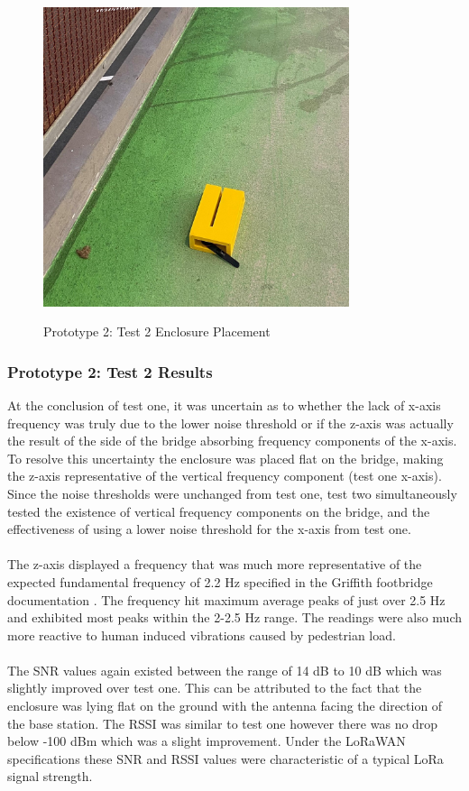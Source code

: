 \begin{figure}[H]
	\centering
	\caption{Prototype 2: Test 2 Enclosure Placement}
	\includegraphics[width=0.8\textwidth]{Sections/Prototype-Testing/bridge-ground.png}
	\label{bridge-ground}
\end{figure}

\subsubsection{Prototype 2: Test 2 Results}
At the conclusion of test one, it was uncertain as to whether the lack of x-axis frequency was truly due to the lower noise threshold or if the z-axis was actually the result of the side of the bridge absorbing frequency components of the x-axis. To resolve this uncertainty the enclosure was placed flat on the bridge, making the z-axis representative of the vertical frequency component (test one x-axis). Since the noise thresholds were unchanged from test one, test two simultaneously tested the existence of vertical frequency components on the bridge, and the effectiveness of using a lower noise threshold for the x-axis from test one.\\\\
The z-axis displayed a frequency that was much more representative of the expected fundamental frequency of 2.2 Hz specified in the Griffith footbridge documentation \cite{griffith-bridge}. The frequency hit maximum average peaks of just over 2.5 Hz and exhibited most peaks within the 2-2.5 Hz range. The readings were also much more reactive to human induced vibrations caused by pedestrian load.\\\\
The SNR values again existed between the range of 14 dB to 10 dB which was slightly improved over test one. This can be attributed to the fact that the enclosure was lying flat on the ground with the antenna facing the direction of the base station. The RSSI was similar to test one however there was no drop below -100 dBm which was a slight improvement. Under the LoRaWAN specifications these SNR and RSSI values were characteristic of a typical LoRa signal strength. 

